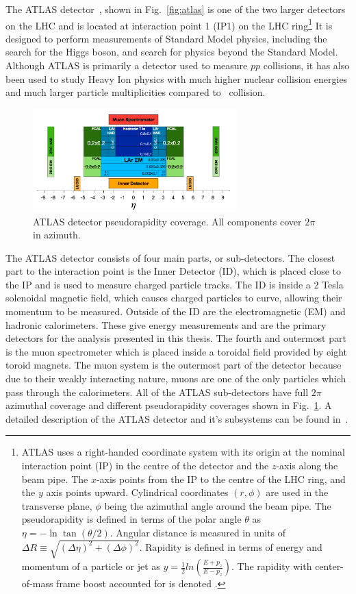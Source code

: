 The ATLAS detector~\cite{Aad:2008zzm}, shown in Fig.~\ref{fig:atlas} is one of the two larger detectors on the LHC and is located at interaction point 1 (IP1) on the LHC ring\footnote{
	ATLAS uses a right-handed coordinate system with its origin at the nominal interaction point (IP) in the centre of the detector and the $z$-axis along the beam pipe. The $x$-axis points from the IP to the centre of the LHC ring, and the $y$ axis points upward. Cylindrical coordinates $(r,\phi)$ are used in the transverse plane, $\phi$ being the azimuthal angle around the beam pipe. The pseudorapidity is defined in terms of the polar angle $\theta$ as $\eta=-\ln\tan(\theta/2)$. Angular distance is measured in units of $\Delta R \equiv \sqrt{(\Delta\eta)^{2} + (\Delta\phi)^{2}}$. Rapidity is defined in terms of energy and momentum of a particle or jet as $y=\frac{1}{2}ln(\frac{E+p_{z}}{E-p_{z}})$. The rapidity with center-of-mass frame boost accounted for is denoted \ystar.} 
It is designed to perform measurements of Standard Model physics, including the search for the Higgs boson, and search for physics beyond the Standard Model. Although ATLAS is primarily a detector used to measure $pp$ collisions, it has also been used to study Heavy Ion physics with much higher nuclear collision energies and much larger particle multiplicities compared to \pp\ collision.

\begin{figure}
	\centering
	\includegraphics[width=0.7\textwidth]{figures/atlaspseudorap.png} %
	\caption{ ATLAS detector pseudorapidity coverage. All components cover $2\pi$ in azimuth. }	
	\label{fig:atlasrap}%
\end{figure}

The ATLAS detector consists of four main parts, or sub-detectors. The closest part to the interaction point is the Inner Detector (ID), which is placed close to the IP and is used to measure charged particle tracks. The ID is inside a 2 Tesla solenoidal magnetic field, which causes charged particles to curve, allowing their momentum to be measured. Outside of the ID are the electromagnetic (EM) and hadronic calorimeters. These give energy measurements and are the primary detectors for the analysis presented in this thesis. The fourth and outermost part is the muon spectrometer which is placed inside a toroidal field provided by eight toroid magnets. The muon system is the outermost part of the detector because due to their weakly interacting nature, muons are one of the only particles which pass through the calorimeters. All of the ATLAS sub-detectors have full $2\pi$ azimuthal coverage and different pseudorapidity coverages shown in  Fig.~\ref{fig:atlasrap}. A detailed description of the ATLAS detector and it's subsystems can be found in~\cite{Aad:2008zzm}. 

